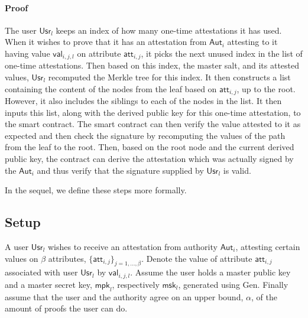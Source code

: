 \documentclass[11pt]{article} %
\newcommand{\aut}{\ensuremath{\mathsf{Aut}_i}}
\newcommand{\att}{\ensuremath{\mathsf{att}_{i,j}}}
\newcommand{\val}{\ensuremath{\mathsf{val}_{i,j,l}}}
\newcommand{\usr}{\ensuremath{\mathsf{Usr}_l}}
\newcommand{\mpk}{\ensuremath{\mathsf{mpk}}}
\newcommand{\msk}{\ensuremath{\mathsf{msk}}}
\begin{document}
\paragraph{Proof}
The user $\usr$ keeps an index of how many one-time attestations it has used. When it wishes to prove that it has an attestation from $\aut$ attesting to it having value $\val$ on attribute $\att$, it picks the next unused index in the list of one-time attestations. Then based on this index, the master salt, and its attested values, $\usr$ recomputed the Merkle tree for this index. It then constructs a list containing the content of the nodes from the leaf based on $\att$, up to the root. However, it also includes the siblings to each of the nodes in the list. It then inputs this list, along with the derived public key for this one-time attestation, to the smart contract. The smart contract can then verify the value attested to it as expected and then check the signature by recomputing the values of the path from the leaf to the root. Then, based on the root node and the current derived public key, the contract can derive the attestation which was actually signed by the $\aut$ and thus verify that the signature supplied by $\usr$ is valid.

In the sequel, we define these steps more formally.

\subsection{Setup}
A user $\usr$ wishes to receive an attestation from authority $\aut$, attesting certain values on $\beta$ attributes, $\{\att\}_{j=1, \dots, \beta}$. Denote the value of attribute $\att$ associated with user $\usr$ by $\val$. Assume the user holds a master public key and a master secret key, $\mpk_l$, respectively $\msk_l$, generated using $\mathrm{Gen}$. Finally assume that the user and the authority agree on an upper bound, $\alpha$, of the amount of proofs the user can do. 
\end{document}
